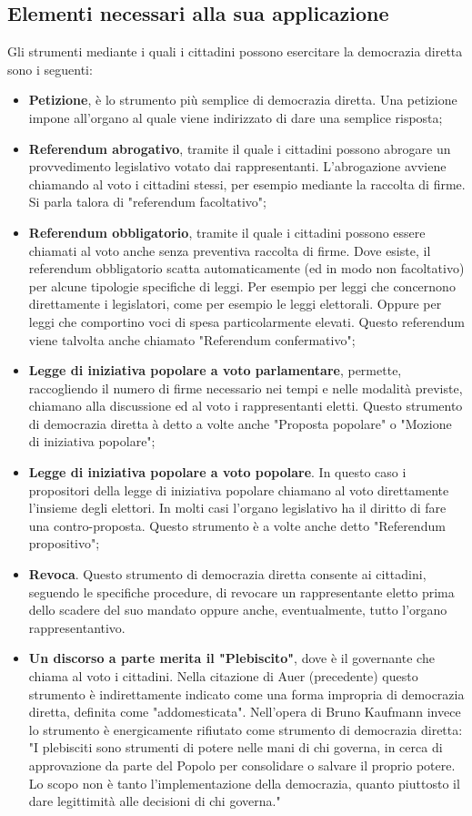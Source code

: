 \documentclass[10pt,a4paper]{book}
\begin{document}
\subsection{Elementi necessari alla sua applicazione}
Gli strumenti mediante i quali i cittadini possono esercitare la democrazia diretta sono i seguenti:
\begin{itemize}
\item 
\textbf{Petizione}, è lo strumento più semplice di democrazia diretta. Una petizione impone all'organo al quale viene indirizzato di dare una semplice risposta;
\item
\textbf{Referendum abrogativo}, tramite il quale i cittadini possono abrogare un provvedimento legislativo votato dai rappresentanti. L'abrogazione avviene chiamando al voto i cittadini stessi, per esempio mediante la raccolta di firme. Si parla talora di "referendum facoltativo";
\item
\textbf{Referendum obbligatorio}, tramite il quale i cittadini possono essere chiamati al voto anche senza preventiva raccolta di firme. Dove esiste, il referendum obbligatorio scatta automaticamente (ed in modo non facoltativo) per alcune tipologie specifiche di leggi. Per esempio per leggi che concernono direttamente i legislatori, come per esempio le leggi elettorali. Oppure per leggi che comportino voci di spesa particolarmente elevati. Questo referendum viene talvolta anche chiamato "Referendum confermativo";
\item
\textbf{Legge di iniziativa popolare a voto parlamentare}, permette, raccogliendo il numero di firme necessario nei tempi e nelle modalità previste, chiamano alla discussione ed al voto i rappresentanti eletti. Questo strumento di democrazia diretta à detto a volte anche "Proposta popolare" o "Mozione di iniziativa popolare";
\item
\textbf{Legge di iniziativa popolare a voto popolare}. In questo caso i propositori della legge di iniziativa popolare chiamano al voto direttamente l'insieme degli elettori. In molti casi l'organo legislativo ha il diritto di fare una contro-proposta. Questo strumento è a volte anche detto "Referendum propositivo";
\item
\textbf{Revoca}. Questo strumento di democrazia diretta consente ai cittadini, seguendo le specifiche procedure, di revocare un rappresentante eletto prima dello scadere del suo mandato oppure anche, eventualmente, tutto l'organo rappresentantivo.
\item
\textbf{Un discorso a parte merita il "Plebiscito"}, dove è il governante che chiama al voto i cittadini. Nella citazione di Auer (precedente) questo strumento è indirettamente indicato come una forma impropria di democrazia diretta, definita come "addomesticata". Nell'opera di Bruno Kaufmann invece lo strumento è energicamente rifiutato come strumento di democrazia diretta: "I plebisciti sono strumenti di potere nelle mani di chi governa, in cerca di approvazione da parte del Popolo per consolidare o salvare il proprio potere. Lo scopo non è tanto l’implementazione della democrazia, quanto piuttosto il dare legittimità alle decisioni di chi governa."
\end{itemize}
\end{document}
